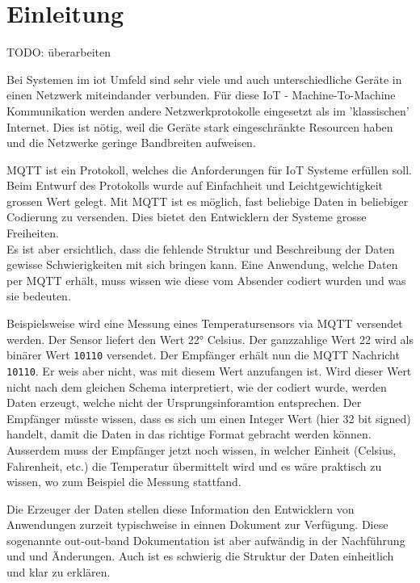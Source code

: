 \chapter{Einleitung}
\label{chap:einleitung}

TODO: überarbeiten

Bei Systemen im \acrfull{iot} Umfeld sind sehr viele und auch unterschiedliche Geräte in einen Netzwerk miteindander verbunden. 
Für diese IoT - Machine-To-Machine Kommunikation werden andere Netzwerkprotokolle eingesetzt als im 'klassischen' Internet. Dies ist nötig, weil die Geräte stark eingeschränkte Resourcen haben und die Netzwerke geringe Bandbreiten aufweisen.

MQTT ist ein Protokoll, welches die Anforderungen für IoT Systeme erfüllen soll. Beim Entwurf des Protokolls wurde auf Einfachheit und Leichtgewichtigkeit grossen Wert gelegt. Mit MQTT ist es möglich, fast beliebige Daten in beliebiger Codierung zu versenden. Dies bietet den Entwicklern der Systeme grosse Freiheiten. \\
Es ist aber ersichtlich, dass die fehlende Struktur und Beschreibung der Daten gewisse Schwierigkeiten mit sich bringen kann. Eine Anwendung, welche Daten per MQTT erhält, muss wissen wie diese vom Absender codiert wurden und was sie bedeuten.

Beispielsweise wird eine Messung eines Temperatursensors via MQTT versendet werden. Der Sensor liefert den Wert 22° Celsius.
Der ganzzahlige Wert 22 wird als binärer Wert \texttt{10110} versendet.
Der Empfänger erhält nun die MQTT Nachricht \texttt{10110}. Er weis aber nicht, was mit diesem Wert anzufangen ist. Wird dieser Wert nicht nach dem gleichen Schema interpretiert, wie der codiert wurde, werden Daten erzeugt, welche nicht der Ursprungsinforamtion entsprechen.
Der Empfänger müsste wissen, dass es sich um einen Integer Wert (hier 32 bit signed) handelt, damit die Daten in das richtige Format gebracht werden können.
Ausserdem muss der Empfänger jetzt noch wissen, in welcher Einheit (Celsius, Fahrenheit, etc.) die Temperatur übermittelt wird und es wäre praktisch zu wissen, wo zum Beispiel die Messung stattfand.

Die Erzeuger der Daten stellen diese Information den Entwicklern von Anwendungen zurzeit typischweise in einnen Dokument zur Verfügung. Diese sogenannte out-out-band Dokumentation ist aber aufwändig in der Nachführung und und Änderungen. Auch ist es schwierig die Struktur der Daten einheitlich und klar zu erklären.

